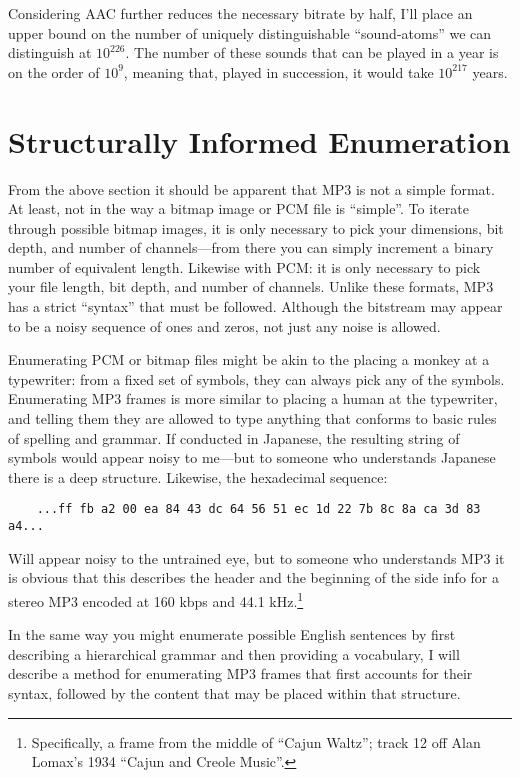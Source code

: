 \documentclass{thesis}
\begin{document}
Considering AAC further reduces the necessary bitrate by half, I'll place an upper bound on the number of uniquely distinguishable ``sound-atoms'' we can distinguish at $10^{226}$. The number of these sounds that can be played in a year is on the order of $10^9$, meaning that, played in succession, it would take $10^{217}$ years.
	
\section{Structurally Informed Enumeration}

	From the above section it should be apparent that MP3 is not a simple format. At least, not in the way a bitmap image or PCM file is ``simple''. To iterate through possible bitmap images, it is only necessary to pick your dimensions, bit depth, and number of channels---from there you can simply increment a binary number of equivalent length. Likewise with PCM: it is only necessary to pick your file length, bit depth, and number of channels. Unlike these formats, MP3 has a strict ``syntax'' that must be followed. Although the bitstream may appear to be a noisy sequence of ones and zeros, not just any noise is allowed.
	
	Enumerating PCM or bitmap files might be akin to the placing a monkey at a typewriter: from a fixed set of symbols, they can always pick any of the symbols. Enumerating MP3 frames is more similar to placing a human at the typewriter, and telling them they are allowed to type anything that conforms to basic rules of spelling and grammar. If conducted in Japanese, the resulting string of symbols would appear noisy to me---but to someone who understands Japanese there is a deep structure. Likewise, the hexadecimal sequence:
	
	\begin{verbatim}
	...ff fb a2 00 ea 84 43 dc 64 56 51 ec 1d 22 7b 8c 8a ca 3d 83 a4...
	\end{verbatim}
	
	Will appear noisy to the untrained eye, but to someone who understands MP3 it is obvious that this describes the header and the beginning of the side info for a stereo MP3 encoded at 160 kbps and 44.1 kHz.\footnote{Specifically, a frame from the middle of ``Cajun Waltz''; track 12 off Alan Lomax's 1934 ``Cajun and Creole Music''.}
	
	In the same way you might enumerate possible English sentences by first describing a hierarchical grammar and then providing a vocabulary, I will describe a method for enumerating MP3 frames that first accounts for their syntax, followed by the content that may be placed within that structure.
	
\end{document}
